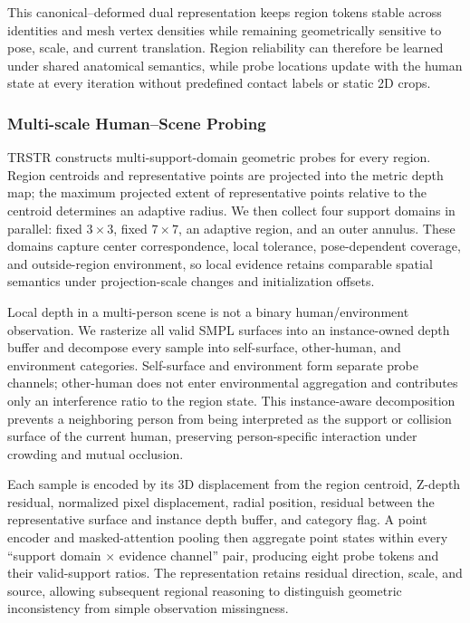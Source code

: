 \documentclass{article}
\begin{document}
This canonical--deformed dual representation keeps region tokens stable across identities and mesh vertex densities while remaining geometrically sensitive to pose, scale, and current translation. Region reliability can therefore be learned under shared anatomical semantics, while probe locations update with the human state at every iteration without predefined contact labels or static 2D crops.

\subsubsection{Multi-scale Human--Scene Probing}

TRSTR constructs multi-support-domain geometric probes for every region. Region centroids and representative points are projected into the metric depth map; the maximum projected extent of representative points relative to the centroid determines an adaptive radius. We then collect four support domains in parallel: fixed $3\times 3$, fixed $7\times 7$, an adaptive region, and an outer annulus. These domains capture center correspondence, local tolerance, pose-dependent coverage, and outside-region environment, so local evidence retains comparable spatial semantics under projection-scale changes and initialization offsets.

Local depth in a multi-person scene is not a binary human/environment observation. We rasterize all valid SMPL surfaces into an instance-owned depth buffer and decompose every sample into self-surface, other-human, and environment categories. Self-surface and environment form separate probe channels; other-human does not enter environmental aggregation and contributes only an interference ratio to the region state. This instance-aware decomposition prevents a neighboring person from being interpreted as the support or collision surface of the current human, preserving person-specific interaction under crowding and mutual occlusion.

Each sample is encoded by its 3D displacement from the region centroid, Z-depth residual, normalized pixel displacement, radial position, residual between the representative surface and instance depth buffer, and category flag. A point encoder and masked-attention pooling then aggregate point states within every ``support domain $\times$ evidence channel'' pair, producing eight probe tokens and their valid-support ratios. The representation retains residual direction, scale, and source, allowing subsequent regional reasoning to distinguish geometric inconsistency from simple observation missingness.
\end{document}
